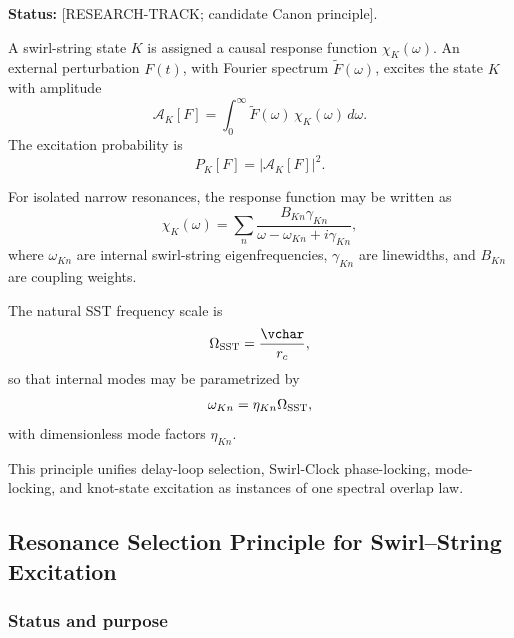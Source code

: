     \noindent
    \textbf{Status:} [RESEARCH-TRACK; candidate Canon principle].
    
    A swirl-string state \(K\) is assigned a causal response function
    \(\chi_K(\omega)\). An external perturbation \(F(t)\), with Fourier
    spectrum \(\widetilde F(\omega)\), excites the state \(K\) with amplitude
    \begin{equation}
        \mathcal A_K[F]
        =
        \int_0^\infty
        \widetilde F(\omega)\,
        \chi_K(\omega)\,
        d\omega .
    \end{equation}
    The excitation probability is
    \begin{equation}
        P_K[F]
        =
        |\mathcal A_K[F]|^2 .
    \end{equation}
    
    For isolated narrow resonances, the response function may be written as
    \begin{equation}
        \chi_K(\omega)
        =
        \sum_n
        \frac{B_{Kn}\gamma_{Kn}}
        {\omega-\omega_{Kn}+i\gamma_{Kn}},
    \end{equation}
    where \(\omega_{Kn}\) are internal swirl-string eigenfrequencies,
    \(\gamma_{Kn}\) are linewidths, and \(B_{Kn}\) are coupling weights.
    
    The natural SST frequency scale is
    \begin{equation}
        \Omega_{\rm SST}
        =
        \frac{\vchar}{r_c},
    \end{equation}
    so that internal modes may be parametrized by
    \begin{equation}
        \omega_{Kn}
        =
        \eta_{Kn}\Omega_{\rm SST},
    \end{equation}
    with dimensionless mode factors \(\eta_{Kn}\).
    
    This principle unifies delay-loop selection, Swirl-Clock phase-locking,
    mode-locking, and knot-state excitation as instances of one spectral
    overlap law.
    
    
\subsection{Resonance Selection Principle for Swirl--String Excitation}
    \label{app:resonance-selection-principle}
    
    \subsubsection*{Status and purpose}
        
